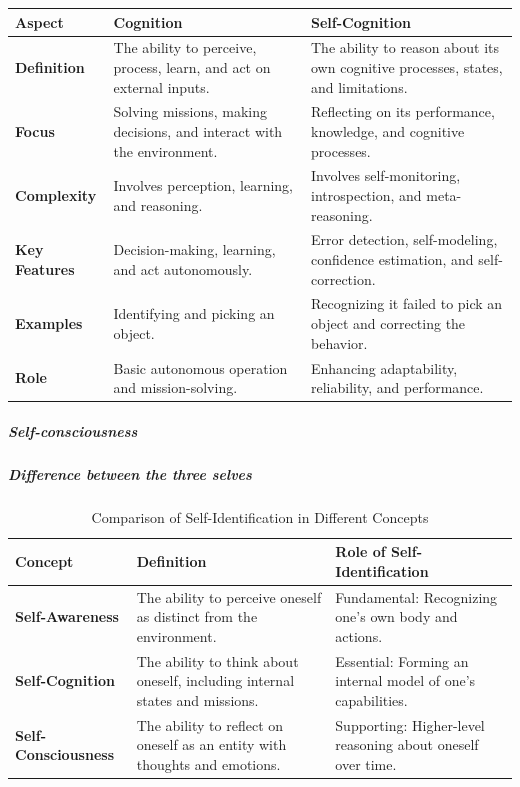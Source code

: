 \documentclass{book}
\begin{document}
\begin{tabular}{|l|l|l|}
    \hline
    \textbf{Aspect}       & \textbf{Cognition}                                                     & \textbf{Self-Cognition}                                                           \\ \hline
    \textbf{Definition}   & The ability to perceive, process, learn, and act on external inputs. & The ability to reason about its own cognitive processes, states, and limitations. \\ \hline
    \textbf{Focus}        & Solving missions, making decisions, and interact with the environment. & Reflecting on its performance, knowledge, and cognitive processes. \\ \hline
    \textbf{Complexity}   & Involves perception, learning, and reasoning.                          & Involves self-monitoring, introspection, and meta-reasoning.                      \\ \hline
    \textbf{Key Features} & Decision-making, learning, and act autonomously.                    & Error detection, self-modeling, confidence estimation, and self-correction.       \\ \hline
    \textbf{Examples}     & Identifying and picking an object.                                     & Recognizing it failed to pick an object and correcting the behavior.              \\ \hline
    \textbf{Role}         & Basic autonomous operation and mission-solving.                           & Enhancing adaptability, reliability, and performance.                             \\ \hline
\end{tabular}


\subparagraph{Self-consciousness}


\subparagraph{Difference between the three selves}
\begin{table}[h!]
    \centering
    \begin{tabular}{|l|l|l|}
        \hline
        \textbf{Concept}
        & \textbf{Definition}
        & \textbf{Role of Self-Identification} \\ \hline
        \textbf{Self-Awareness}
        & The ability to perceive oneself as distinct from the environment.
        & Fundamental: Recognizing one’s own body and actions. \\ \hline
        \textbf{Self-Cognition}
        & The ability to think about oneself, including internal states and missions.
        & Essential: Forming an internal model of one’s capabilities. \\ \hline
        \textbf{Self-Consciousness}
        & The ability to reflect on oneself as an entity with thoughts and emotions.
        & Supporting: Higher-level reasoning about oneself over time. \\ \hline
    \end{tabular}
    \caption{Comparison of Self-Identification in Different Concepts}
\end{table}
\end{document}
